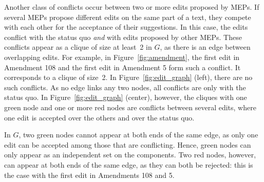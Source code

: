 Another class of conflicts occur between two or more edits proposed by MEPs.
If several MEPs propose different edits on the same part of a text, they compete with each other for the acceptance of their suggestions.
In this case, the edits conflict with the status quo \textit{and} with edits proposed by other MEPs.
These conflicts appear as a clique of size at least~2 in $G$, as there is an edge between overlapping edits.
For example, in Figure~\ref{fig:amendment}, the first edit in Amendment 108 and the first edit in Amendment 5 form such a conflict.
It corresponds to a clique of size~2.
In Figure~\ref{fig:edit_graph} (left), there are no such conflicts.
As no edge links any two nodes, all conflicts are only with the status quo.
In Figure~\ref{fig:edit_graph} (center), however, the cliques with one green node and one or more red nodes are conflicts between several edits, where one edit is accepted over the others and over the status quo.

In $G$, two green nodes cannot appear at both ends of the same edge, as only one edit can be accepted among those that are conflicting.
Hence, green nodes can only appear as an independent set on the components.
Two red nodes, however, can appear at both ends of the same edge, as they can both be rejected: this is the case with the first edit in Amendments 108 and 5.
